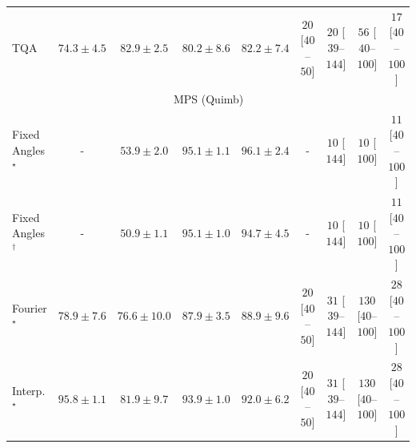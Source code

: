 \begin{tabular}{l|cccc|cccc|}
TQA & {\cellcolor[HTML]{8C91C4}} \color[HTML]{F1F1F1} $74.3\pm 4.5$ & {\cellcolor[HTML]{8A51A5}} \color[HTML]{F1F1F1} $82.9\pm 2.5$ & {\cellcolor[HTML]{8B65AE}} \color[HTML]{F1F1F1} $80.2\pm 8.6$ & {\cellcolor[HTML]{8A56A7}} \color[HTML]{F1F1F1} $82.2\pm 7.4$ & {\cellcolor[HTML]{FFF4F0}} \color[HTML]{000000} $20$ [$40$--$50$] & {\cellcolor[HTML]{FFF4F0}} \color[HTML]{000000} $20$ [$39$--$144$] & {\cellcolor[HTML]{FEEBE8}} \color[HTML]{000000} $56$ [$40$--$100$] & {\cellcolor[HTML]{FFF5F1}} \color[HTML]{000000} $17$ [$40$--$100$] \\
\cline{1-9}
\multicolumn{9}{c}{\rule{0pt}{8pt}MPS (Quimb)} \\
\midrule
Fixed Angles$^\star$ & {\cellcolor[HTML]{000000}} \color[HTML]{F1F1F1} {\cellcolor{white}} \color{black} - & {\cellcolor[HTML]{FFFBD0}} \color[HTML]{000000} $53.9\pm 2.0$ & {\cellcolor[HTML]{712806}} \color[HTML]{F1F1F1} $95.1\pm 1.1$ & {\cellcolor[HTML]{692606}} \color[HTML]{F1F1F1} $96.1\pm 2.4$ & {\cellcolor[HTML]{000000}} \color[HTML]{F1F1F1} {\cellcolor{white}} \color{black} - & {\cellcolor[HTML]{FFF7F3}} \color[HTML]{000000} $10$ [$144$] & {\cellcolor[HTML]{FFF7F3}} \color[HTML]{000000} $10$ [$100$] & {\cellcolor[HTML]{FFF6F2}} \color[HTML]{000000} $11$ [$40$--$100$] \\
Fixed Angles$^\dagger$ & {\cellcolor[HTML]{000000}} \color[HTML]{F1F1F1} {\cellcolor{white}} \color{black} - & {\cellcolor[HTML]{FFFFE5}} \color[HTML]{000000} $50.9\pm 1.1$ & {\cellcolor[HTML]{712806}} \color[HTML]{F1F1F1} $95.1\pm 1.0$ & {\cellcolor[HTML]{762A05}} \color[HTML]{F1F1F1} $94.7\pm 4.5$ & {\cellcolor[HTML]{000000}} \color[HTML]{F1F1F1} {\cellcolor{white}} \color{black} - & {\cellcolor[HTML]{FFF7F3}} \color[HTML]{000000} $10$ [$144$] & {\cellcolor[HTML]{FFF7F3}} \color[HTML]{000000} $10$ [$100$] & {\cellcolor[HTML]{FFF6F2}} \color[HTML]{000000} $11$ [$40$--$100$] \\
Fourier$^\star$ & {\cellcolor[HTML]{ED7316}} \color[HTML]{F1F1F1} $78.9\pm 7.6$ & {\cellcolor[HTML]{F5841E}} \color[HTML]{F1F1F1} $76.6\pm 10.0$ & {\cellcolor[HTML]{B34003}} \color[HTML]{F1F1F1} $87.9\pm 3.5$ & {\cellcolor[HTML]{A93C03}} \color[HTML]{F1F1F1} $88.9\pm 9.6$ & {\cellcolor[HTML]{FFF4F0}} \color[HTML]{000000} $20$ [$40$--$50$] & {\cellcolor[HTML]{FFF2EE}} \color[HTML]{000000} $31$ [$39$--$144$] & {\cellcolor[HTML]{FDD9D6}} \color[HTML]{000000} $130$ [$40$--$100$] & {\cellcolor[HTML]{FFF3EF}} \color[HTML]{000000} $28$ [$40$--$100$] \\
Interp.$^\star$ & {\cellcolor[HTML]{6B2606}} \color[HTML]{F1F1F1} $95.8\pm 1.1$ & {\cellcolor[HTML]{DD5F0C}} \color[HTML]{F1F1F1} $81.9\pm 9.7$ & {\cellcolor[HTML]{7C2C05}} \color[HTML]{F1F1F1} $93.9\pm 1.0$ & {\cellcolor[HTML]{8E3104}} \color[HTML]{F1F1F1} $92.0\pm 6.2$ & {\cellcolor[HTML]{FFF4F0}} \color[HTML]{000000} $20$ [$40$--$50$] & {\cellcolor[HTML]{FFF2EE}} \color[HTML]{000000} $31$ [$39$--$144$] & {\cellcolor[HTML]{FDD9D6}} \color[HTML]{000000} $130$ [$40$--$100$] & {\cellcolor[HTML]{FFF3EF}} \color[HTML]{000000} $28$ [$40$--$100$] \\

\end{tabular}
